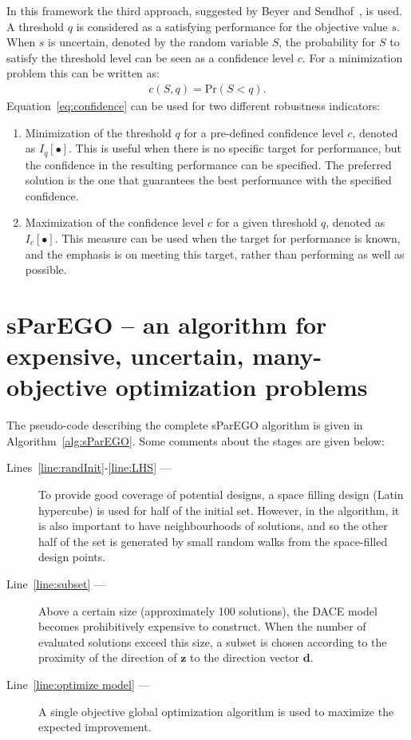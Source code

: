 \documentclass[10pt]{llncs}
\newcommand{\brr}[1]{{\left({#1}\right)}} %
\newcommand{\Iq}[1]{\ensuremath{I_q\!\left[{#1}\right]}} %
\newcommand{\Ic}[1]{\ensuremath{I_c\!\left[{#1}\right]}} %
\newcommand{\vz}{\ensuremath{\mathbf{z}}} %
\newcommand{\vd}{\ensuremath{\mathbf{d}}} %
\begin{document}
In this framework the third approach, suggested by Beyer and Sendhof~\cite{Beyer2007}, is used. A threshold $q$ is considered as a satisfying performance for the objective value $s$. When $s$ is uncertain, denoted by the random variable $S$, the probability for $S$ to satisfy the threshold level can be seen as a confidence level $c$. For a minimization problem this can be written as:
\begin{align}
\label{eq:confidence}
	c\brr{S,q}=\text{Pr}\brr{S<q}.
\end{align}
Equation~\eqref{eq:confidence} can be used for two different robustness indicators:
\begin{enumerate}
	\item Minimization of the threshold $q$ for a pre-defined confidence level $c$, denoted as $\Iq{\bullet}$.
		This is useful when there is no specific target for performance, but the confidence in the resulting performance can be specified.
		The preferred solution is the one that guarantees the best performance with the specified confidence.
	\item Maximization of the confidence level $c$ for a given threshold $q$, denoted as $\Ic{\bullet}$.
		This measure can be used when the target for performance is known, and the emphasis is on meeting this target, rather than performing as well as possible.
\end{enumerate}

\section{sParEGO -- an algorithm for expensive, uncertain, many-objective optimization problems}
\label{sec:sParEGO}
The pseudo-code describing the complete sParEGO algorithm is given in Algorithm~\ref{alg:sParEGO}. Some comments about the stages are given below:
\begin{description}
	\item[Lines~\ref{line:randInit}-\ref{line:LHS} ---] To provide good coverage of potential designs, a space filling design (Latin hypercube) is used for half of the initial set. However, in the algorithm, it is also important to have neighbourhoods of solutions, and so the other half of the set is generated by small random walks from the space-filled design points.
	\item[Line~\ref{line:subset} ---] Above a certain size (approximately 100 solutions), the DACE model becomes prohibitively expensive to construct. When the number of evaluated solutions exceed this size, a subset is chosen according to the proximity of the direction of $\vz$ to the direction vector $\vd$.
	\item[Line~\ref{line:optimize model} ---] A single objective global optimization algorithm is used to maximize the expected improvement.
\end{description}
\end{document}

